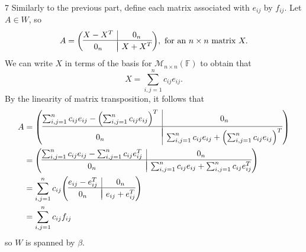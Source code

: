 \documentclass{article}
\makeatletter
\newenvironment{amatrix}[1]{%
  \left(\begin{array}{@{}*{#1}{c}|c@{}}
}{%
  \end{array}\right)
}
\theoremstyle{plain} %
\numberwithin{thm}{section} %
\theoremstyle{definition}
\makeatother
\begin{document}
\begin{question}{7}
        Similarly to the previous part, define each matrix associated with \(e_{ij}\) by \(f_{ij}\). Let \(A \in W\), so
        \[
            A = \begin{amatrix}{1}
                X - X^T & 0_n \\
                \hline \\[-10pt]
                0_n & X + X^T
            \end{amatrix}, \text{ for an } n\times n \text{ matrix } X.
        \]
        We can write \(X\) in terms of the basis for \(\mathcal{M} _{n\times n}(\mathbb{F})\) to obtain that
        \[
            X = \sum_{i,j=1}^{n} c_{ij} e_{ij}.
        \]
        By the linearity of matrix transposition, it follows that
        \begin{align*}
            A &= \begin{amatrix}{1}
                \sum_{i,j=1}^{n} c_{ij} e_{ij} - \left( \sum_{i,j=1}^{n} c_{ij} e_{ij} \right)^T & 0_n \\
                \hline \\[-10pt]
                0_n & \sum_{i,j=1}^{n} c_{ij} e_{ij} + \left( \sum_{i,j=1}^{n} c_{ij} e_{ij} \right)^T
            \end{amatrix} \\
            &= \begin{amatrix}{1}
                \sum_{i,j=1}^{n} c_{ij} e_{ij} -\sum_{i,j=1}^{n} c_{ij} e_{ij}^T & 0_n \\
                \hline \\[-10pt]
                0_n & \sum_{i,j=1}^{n} c_{ij} e_{ij} + \sum_{i,j=1}^{n} c_{ij} e_{ij}^T \\
            \end{amatrix} \\
            &= \sum_{i,j=1}^{n} c_{ij}\begin{amatrix}{1}
                e_{ij} - e_{ij}^T & 0_n \\
                \hline \\[-10pt]
                0_n &  e_{ij} + e_{ij}^T \\
            \end{amatrix} \\
            &= \sum_{i,j=1}^{n} c_{ij} f_{ij}
        \end{align*}
        so \(W\) is spanned by \(\beta\).


\end{question}
\end{document}
